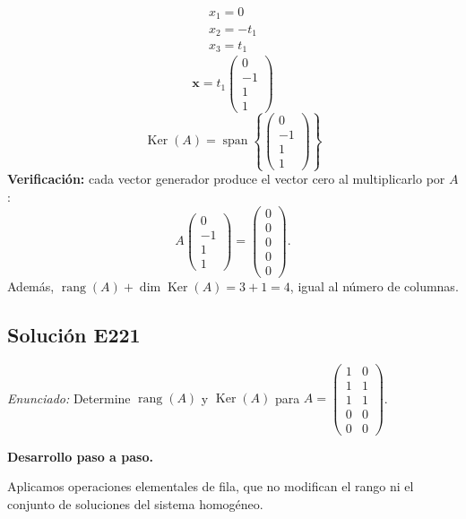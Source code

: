 \documentclass[12pt]{article}
\theoremstyle{remark}
\newcommand{\rang}{\operatorname{rang}}
\newcommand{\Ker}{\operatorname{Ker}}
\newcommand{\vect}[1]{\boldsymbol{#1}}
\newcommand{\solucion}[2]{\Needspace{11\baselineskip}\subsection*{Solución E#1}\noindent\textit{Enunciado:} #2\par\medskip\noindent\textbf{Desarrollo paso a paso.}\par\medskip}
\begin{document}
\[
\begin{aligned}x_{1}=0\\x_{2}=- t_{1}\\x_{3}=t_{1}\end{aligned}
\]
\[
\vect x=t_{1}\begin{pmatrix}0\\-1\\1\\1\end{pmatrix}
\]
\[
\boxed{\Ker(A)=\operatorname{span}\left\{\begin{pmatrix}0\\-1\\1\\1\end{pmatrix}\right\}}
\]
\textbf{Verificación:} cada vector generador produce el vector cero al multiplicarlo por $A$:
\[
A\begin{pmatrix}0\\-1\\1\\1\end{pmatrix}=\begin{pmatrix}0\\0\\0\\0\\0\end{pmatrix}.
\]
Además, $\rang(A)+\dim\Ker(A)=3+1=4$, igual al número de columnas.


\medskip

\solucion{221}{Determine $\rang(A)$ y $\Ker(A)$ para $A=\begin{pmatrix}1&0\\1&1\\1&1\\0&0\\0&0\end{pmatrix}$.}
Aplicamos operaciones elementales de fila, que no modifican el rango ni el conjunto de soluciones del sistema homogéneo.
\end{document}
